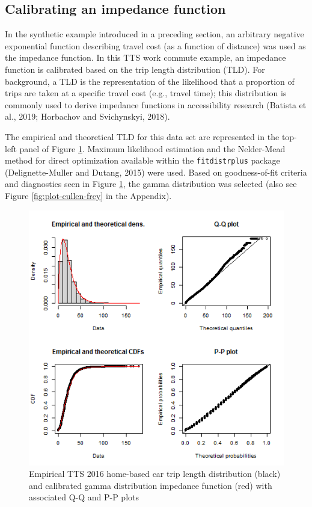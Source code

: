 \documentclass[]{elsarticle} %
\begin{document}
\hypertarget{calibrating-an-impedance-function}{%
\subsection{Calibrating an impedance
function}\label{calibrating-an-impedance-function}}

In the synthetic example introduced in a
\protect\hypertarget{accessibility-numerical-example}{}{preceding
section}, an arbitrary negative exponential function describing travel
cost (as a function of distance) was used as the impedance function. In
this TTS work commute example, an impedance function is calibrated based
on the trip length distribution (TLD). For background, a TLD is the
representation of the likelihood that a proportion of trips are taken at
a specific travel cost (e.g., travel time); this distribution is
commonly used to derive impedance functions in accessibility research
(Batista et al., 2019; Horbachov and Svichynskyi, 2018).

The empirical and theoretical TLD for this data set are represented in
the top-left panel of Figure \ref{fig:TLD-Gamma-plot}. Maximum
likelihood estimation and the Nelder-Mead method for direct optimization
available within the \texttt{fitdistrplus} package (Delignette-Muller
and Dutang, 2015) were used. Based on goodness-of-fit criteria and
diagnostics seen in Figure \ref{fig:TLD-Gamma-plot}, the gamma
distribution was selected (also see Figure \ref{fig:plot-cullen-frey} in
the Appendix).

\begin{figure}
\includegraphics[width=1\linewidth]{images/impedance_function} \caption{\label{fig:TLD-Gamma-plot}Empirical TTS 2016 home-based car trip length distribution (black) and calibrated gamma distribution impedance function (red) with associated Q-Q and P-P plots}\label{fig:TLD-Gamma-plot}
\end{figure}
\end{document}
